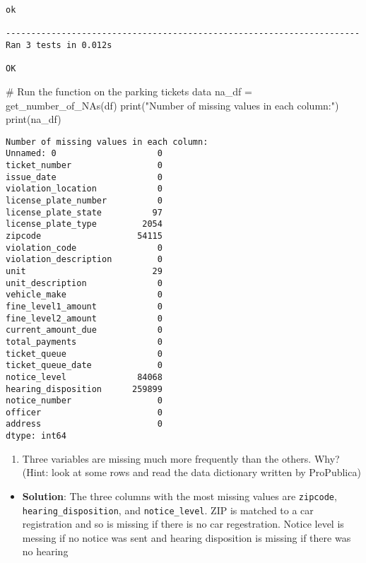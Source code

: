 \documentclass[
  letterpaper,
  DIV=11,
  numbers=noendperiod]{scrartcl}
\newenvironment{Shaded}{\begin{snugshade}}{\end{snugshade}}
\newcommand{\BuiltInTok}[1]{\textcolor[rgb]{0.00,0.23,0.31}{#1}}
\newcommand{\CommentTok}[1]{\textcolor[rgb]{0.37,0.37,0.37}{#1}}
\newcommand{\NormalTok}[1]{\textcolor[rgb]{0.00,0.23,0.31}{#1}}
\newcommand{\OperatorTok}[1]{\textcolor[rgb]{0.37,0.37,0.37}{#1}}
\newcommand{\StringTok}[1]{\textcolor[rgb]{0.13,0.47,0.30}{#1}}
\providecommand{\tightlist}{%
  \setlength{\itemsep}{0pt}\setlength{\parskip}{0pt}}\usepackage{longtable,booktabs,array}
\begin{document}
\begin{verbatim}
ok

----------------------------------------------------------------------
Ran 3 tests in 0.012s

OK
\end{verbatim}

\begin{Shaded}
\begin{Highlighting}[]
\CommentTok{\# Run the function on the parking tickets data}
\NormalTok{na\_df }\OperatorTok{=}\NormalTok{ get\_number\_of\_NAs(df)}
\BuiltInTok{print}\NormalTok{(}\StringTok{"Number of missing values in each column:"}\NormalTok{)}
\BuiltInTok{print}\NormalTok{(na\_df)}
\end{Highlighting}
\end{Shaded}

\begin{verbatim}
Number of missing values in each column:
Unnamed: 0                    0
ticket_number                 0
issue_date                    0
violation_location            0
license_plate_number          0
license_plate_state          97
license_plate_type         2054
zipcode                   54115
violation_code                0
violation_description         0
unit                         29
unit_description              0
vehicle_make                  0
fine_level1_amount            0
fine_level2_amount            0
current_amount_due            0
total_payments                0
ticket_queue                  0
ticket_queue_date             0
notice_level              84068
hearing_disposition      259899
notice_number                 0
officer                       0
address                       0
dtype: int64
\end{verbatim}

\begin{enumerate}
\def\labelenumi{\arabic{enumi}.}
\setcounter{enumi}{1}
\tightlist
\item
  Three variables are missing much more frequently than the others. Why?
  (Hint: look at some rows and read the data dictionary written by
  ProPublica)
\end{enumerate}

\begin{itemize}
\tightlist
\item
  \textbf{Solution}: The three columns with the most missing values are
  \texttt{zipcode}, \texttt{hearing\_disposition}, and
  \texttt{notice\_level}. ZIP is matched to a car registration and so is
  missing if there is no car regestration. Notice level is messing if no
  notice was sent and hearing disposition is missing if there was no
  hearing
\end{itemize}
\end{document}
